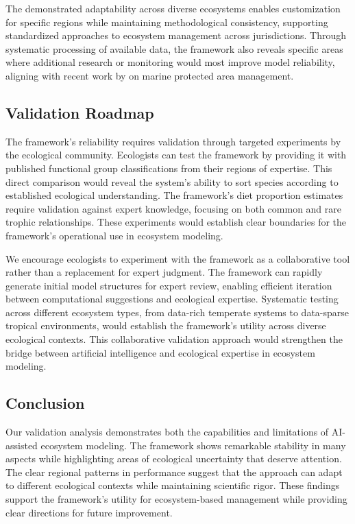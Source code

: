 The demonstrated adaptability across diverse ecosystems enables customization for specific regions while maintaining methodological consistency, supporting standardized approaches to ecosystem management across jurisdictions. Through systematic processing of available data, the framework also reveals specific areas where additional research or monitoring would most improve model reliability, aligning with recent work by \cite{Chen2024} on marine protected area management.

\subsection{Validation Roadmap}

The framework's reliability requires validation through targeted experiments by the ecological community. Ecologists can test the framework by providing it with published functional group classifications from their regions of expertise. This direct comparison would reveal the system's ability to sort species according to established ecological understanding. The framework's diet proportion estimates require validation against expert knowledge, focusing on both common and rare trophic relationships. These experiments would establish clear boundaries for the framework's operational use in ecosystem modeling.

We encourage ecologists to experiment with the framework as a collaborative tool rather than a replacement for expert judgment. The framework can rapidly generate initial model structures for expert review, enabling efficient iteration between computational suggestions and ecological expertise. Systematic testing across different ecosystem types, from data-rich temperate systems to data-sparse tropical environments, would establish the framework's utility across diverse ecological contexts. This collaborative validation approach would strengthen the bridge between artificial intelligence and ecological expertise in ecosystem modeling.

\subsection{Conclusion}

Our validation analysis demonstrates both the capabilities and limitations of AI-assisted ecosystem modeling. The framework shows remarkable stability in many aspects while highlighting areas of ecological uncertainty that deserve attention. The clear regional patterns in performance suggest that the approach can adapt to different ecological contexts while maintaining scientific rigor. These findings support the framework's utility for ecosystem-based management while providing clear directions for future improvement.

